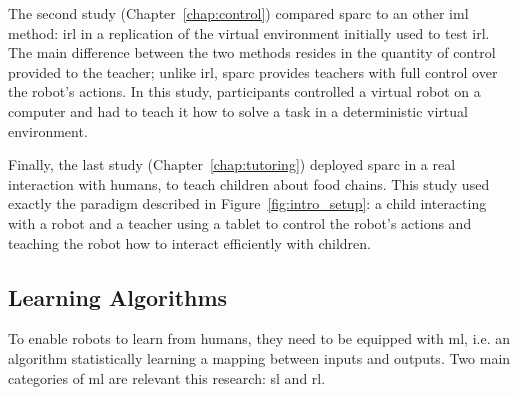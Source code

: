 The second study (Chapter~\ref{chap:control}) compared \gls{sparc} to an other \gls{iml} method: \gls{irl} in a replication of the virtual environment initially used to test \gls{irl}. The main difference between the two methods resides in the quantity of control provided to the teacher; unlike \gls{irl}, \gls{sparc} provides teachers with full control over the robot's actions. In this study, participants controlled a virtual robot on a computer and had to teach it how to solve a task in a deterministic virtual environment.

Finally, the last study (Chapter~\ref{chap:tutoring}) deployed \gls{sparc} in a real interaction with humans, to teach children about food chains. This study used exactly the paradigm described in Figure~\ref{fig:intro_setup}: a child interacting with a robot and a teacher using a tablet to control the robot's actions and teaching the robot how to interact efficiently with children. 

%
%
%
%
%

\subsection{Learning Algorithms}
To enable robots to learn from humans, they need to be equipped with \acrfull{ml}, i.e. an algorithm statistically learning a mapping between inputs and outputs. Two main categories of \gls{ml} are relevant this research: \gls{sl} and \gls{rl}.

